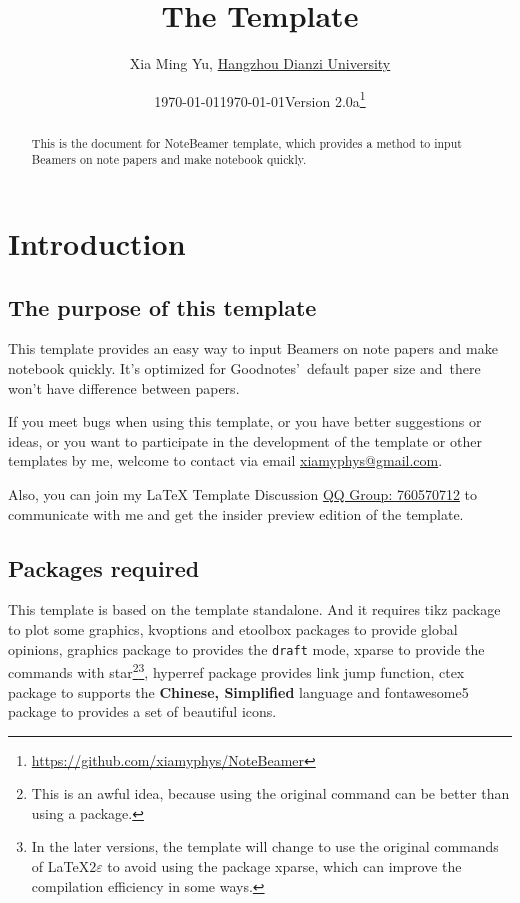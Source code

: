 \documentclass[11pt]{article}
\title{The \pkg{NoteBeamer} Template}
\author[1]{Xia Ming Yu, \href{https://www.hdu.edu.cn}{Hangzhou Dianzi University}}
\date{\today}
\affil[1]{\href{mailto:xiamyphys@gmail.com}{\texttt{xiamyphys@gmail.com}}}
\date{\today\quad Version 2.0a\thanks{%
  \url{https://github.com/xiamyphys/NoteBeamer}}}
\makeatletter
\def\@pkg#1{\texorpdfstring{\href{https://www.ctan.org/pkg/#1}%
{\textcolor{pkgcolor}{\textsf{#1}}}}{“#1”}}
\def\s@pkg#1{\texorpdfstring{\textcolor{pkgcolor}{\textsf{#1}}}{“#1”}}
\DeclareRobustCommand\pkg{\@ifstar\s@pkg\@pkg}
\makeatother
\begin{document}
\maketitle

\begin{abstract}
This is the document for \pkg{NoteBeamer} template, which provides a method to input Beamers on note papers and make notebook quickly.

\end{abstract}

\tableofcontents

\section{Introduction}

\subsection{The purpose of this template}
This template provides an easy way to input Beamers on note papers and make notebook quickly. It's optimized for Goodnotes' default paper size and there won't have difference between papers.

If you meet bugs when using this template, or you have better suggestions or ideas, or you want to participate in the development of the template or other templates by me, welcome to contact via email \href{mailto:xiamyphys@gmail.com}{xiamyphys@gmail.com}.

Also, you can join my \textsf\LaTeX{} Template Discussion \href{https://qm.qq.com/q/OnHzbNvVAG}{QQ Group: 760570712} to communicate with me and get the insider preview edition of the template.

\subsection{Packages required}
This template is based on the template \pkg{standalone}. And it requires \pkg{tikz} package to plot some graphics, \pkg{kvoptions} and \pkg{etoolbox} packages to provide global opinions, \pkg{graphics} package to provides the \verb|draft| mode, \pkg{xparse} to provide the commands with star\footnote{This is an awful idea, because using the original command can be better than using a package.}\footnote{In the later versions, the template will change to use the original commands of \textsf\LaTeX{$2\varepsilon$} to avoid using the package \pkg{xparse}, which can improve the compilation efficiency in some ways.}, \pkg{hyperref} package provides link jump function, \pkg{ctex} package to supports the \textbf{Chinese, Simplified} language and \pkg{fontawesome5} package to provides a set of beautiful icons.
\end{document}
